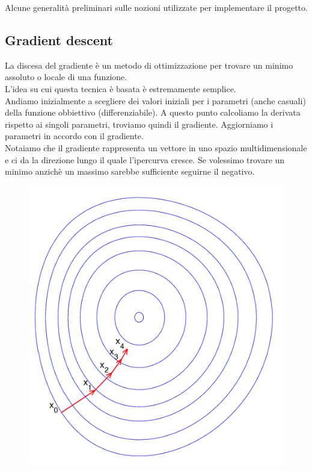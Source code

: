 \documentclass[12pt]{article}
\begin{document}
Alcune generalità preliminari sulle nozioni utilizzate
per implementare il progetto.


\subsection{Gradient descent}

La discesa del gradiente è un metodo di ottimizzazione
per trovare un minimo assoluto o locale di una funzione.\\

L'idea su cui questa tecnica è basata è estremamente semplice.\\
Andiamo inizialmente a scegliere dei valori iniziali per i parametri (anche casuali)
della funzione obbiettivo (differenziabile). A questo punto calcoliamo 
la derivata rispetto ai singoli parametri, 
troviamo quindi il gradiente. Aggiorniamo i parametri in accordo con il gradiente.\\

Notaiamo che il gradiente rappresenta un vettore in uno spazio 
multidimensionale e ci da la direzione lungo il quale l'ipercurva cresce.
Se volessimo trovare un minimo anzichè un massimo sarebbe sufficiente
seguirne il negativo.\\

\begin{figure}[H]{}
    \centering
    \includegraphics[scale=0.5]{../images/grd.png}
    \label{fig:cc}
\end{figure}
\end{document}
